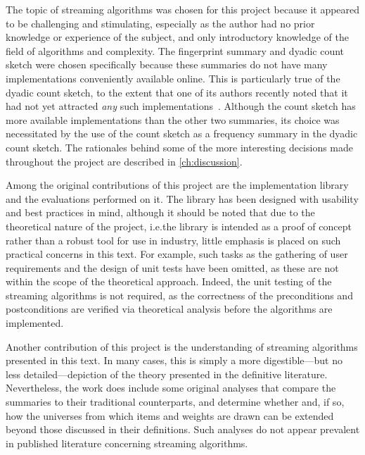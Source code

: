 The topic of streaming algorithms was chosen for this project because it appeared to be challenging and stimulating, especially as the author had no prior knowledge or experience of the subject, and only introductory knowledge of the field of algorithms and complexity.
The fingerprint summary and dyadic count sketch were chosen specifically because these summaries do not have many implementations conveniently available online.
This is particularly true of the dyadic count sketch, to the extent that one of its authors recently noted that it had not yet attracted \emph{any} such implementations~\citep{cormode20}.
Although the count sketch has more available implementations than the other two summaries, its choice was necessitated by the use of the count sketch as a frequency summary in the dyadic count sketch.
The rationales behind some of the more interesting decisions made throughout the project are described in \cref{ch:discussion}.

Among the original contributions of this project are the implementation library and the evaluations performed on it.
The library has been designed with usability and best practices in mind, although it should be noted that due to the theoretical nature of the project, i.e.\@ the library is intended as a proof of concept rather than a robust tool for use in industry, little emphasis is placed on such practical concerns in this text.
For example, such tasks as the gathering of user requirements and the design of unit tests have been omitted, as these are not within the scope of the theoretical approach.
Indeed, the unit testing of the streaming algorithms is not required, as the correctness of the preconditions and postconditions are verified via theoretical analysis before the algorithms are implemented.

Another contribution of this project is the understanding of streaming algorithms presented in this text.
In many cases, this is simply a more digestible---but no less detailed---depiction of the theory presented in the definitive literature.
Nevertheless, the work does include some original analyses that compare the summaries to their traditional counterparts, and determine whether and, if so, how the universes from which items and weights are drawn can be extended beyond those discussed in their definitions.
Such analyses do not appear prevalent in published literature concerning streaming algorithms.
